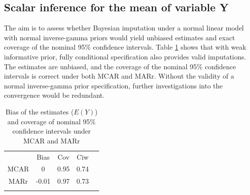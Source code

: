 	\subsection{Scalar inference for the mean of variable Y}
	The aim is to assess whether Bayesian imputation under a normal linear model with normal inverse-gamma priors would yield unbiased estimates and exact coverage of the nominal 95\% confidence intervals. Table \ref{tab5_1} shows that with weak informative prior, fully conditional specification also provides valid imputations. The estimates are unbiased, and the coverage of the nominal 95\% confidence intervals is correct under both MCAR and MARr. Without the validity of a normal inverse-gamma prior specification, further investigations into the convergence would be redundant. 
	\begin{table}[h]
		\centering
		\vspace{0.5cm}
		\begin{tabular}{ccccc}
			& Bias  & Cov  & Ciw &  \\
			MCAR & 0     & 0.95 & 0.74 &  \\
			MARr & -0.01 & 0.97 & 0.73 &  \\
			&       &      &  & 
		\end{tabular}
		\caption{Bias of the estimates ($E(Y)$) and coverage of nominal 95\% confidence intervals under MCAR and MARr}
		\label{tab5_1}
	\end{table}
	
